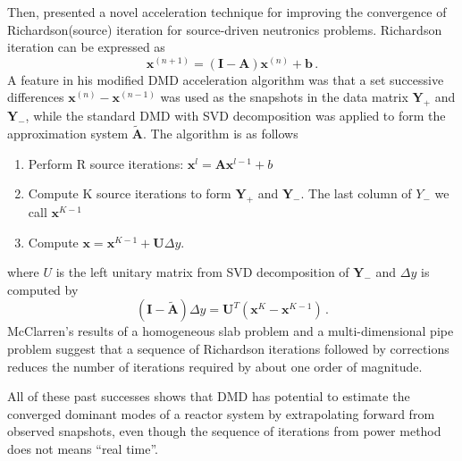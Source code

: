 Then, \citet{mcclarren_acceleration_2018} presented a novel acceleration technique for improving the convergence of Richardson(source) iteration for source-driven neutronics problems.
Richardson iteration can be expressed as 
\begin{equation}
 \mathbf{x}^{(n+1)} = (\mathbf{I}-\mathbf{A})\mathbf{x}^{(n)} + \mathbf{b} \, .
 \label{eq:richardson}
\end{equation}
A feature in his modified DMD acceleration algorithm was that a set successive differences $\mathbf{x}^{(n)}-\mathbf{x}^{(n-1)}$ was used as the snapshots in the data matrix $\mathbf{Y}_+$ and $\mathbf{Y}_-$, while the standard DMD with SVD decomposition was applied to form the approximation system $\mathbf{\tilde{A}}$.
The algorithm is as follows
\begin{enumerate}
 \item Perform R source iterations: $\mathbf{x}^{l} = \mathbf{A} \mathbf{x}^{l-1} +b$
 \item Compute K source iterations to form $\mathbf{Y}_+$ and $\mathbf{Y}_-$. The last column of $Y_-$ we call $\mathbf{x}^{K-1}$ 
 \item Compute $\mathbf{x} = \mathbf{x}^{K-1} + \mathbf{U} \Delta y$.
\end{enumerate} 
where $U$ is the left unitary matrix from SVD decomposition of $\mathbf{Y}_-$ and $\Delta y$ is computed by 
\begin{equation}
 (\mathbf{I} - \mathbf{\tilde{A}}) \Delta y = \mathbf{U}^T(\mathbf{x}^{K} - \mathbf{x}^{K-1})\, .
 \label{eq:McClarren}
\end{equation}
McClarren's results of a homogeneous slab problem and a multi-dimensional pipe problem suggest that a sequence of Richardson iterations followed by corrections reduces the number of iterations required by about one order of magnitude.

All of these past successes shows that DMD has potential to estimate the converged dominant modes of a reactor system by extrapolating forward from observed snapshots, even though the sequence of iterations from power method does not means ``real time''.

